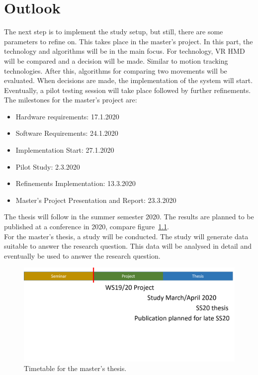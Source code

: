 \chapter{Outlook}
The next step is to implement the study setup, but still, there are some parameters to refine on. This takes place in the master's project. In this part, the technology and algorithms will be in the main focus. For technology, VR HMD will be compared and a decision will be made. Similar to motion tracking technologies. After this, algorithms for comparing two movements will be evaluated. When decisions are made, the implementation of the system will start. Eventually, a pilot testing session will take place followed by further refinements.
The milestones for the master's project are:
\begin{itemize}
\item Hardware requirements: 17.1.2020
\item Software Requirements: 24.1.2020
\item Implementation Start: 27.1.2020
\item Pilot Study: 2.3.2020
\item Refinements Implementation: 13.3.2020
\item Master’s Project Presentation and Report: 23.3.2020
\end{itemize}
The thesis will follow in the summer semester 2020. The results are planned to be published at a conference in 2020, compare figure~\ref{fig:outlook}.\\
For the master's thesis, a study will be conducted. The study will generate data suitable to answer the research question. This data will be analysed in detail and eventually be used to answer the research question.

\begin{figure}
	\centering
	\includegraphics[width=1.0\textwidth]{img/outlook.png}
	\caption{Timetable for the master's thesis.}
	\label{fig:outlook}
\end{figure}